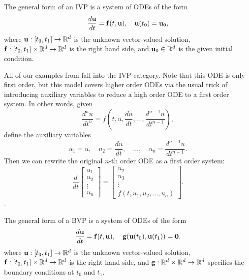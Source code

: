 \begin{definition}[IVP]
    \label{def:ivp}
    The general form of an IVP is a system of ODEs of the form 
    \begin{equation*}
        \frac{d\mathbf{u}}{dt} = \mathbf{f}(t, \mathbf{u}), 
        \quad \mathbf{u}(t_0) = \mathbf{u}_0,
    \end{equation*}
    where $\mathbf{u}: [t_0, t_1] \to \mathbb{R}^d$ is the unknown vector-valued 
    solution, $\mathbf{f}: [t_0, t_1] \times \mathbb{R}^d \to \mathbb{R}^d$ is the right hand side, 
    and $\mathbf{u}_0 \in \mathbb{R}^d$ is the given initial condition.
\end{definition}
All of our examples from  fall into the IVP category. 
Note that this ODE is only first order, but this model covers 
higher order ODEs via the usual trick of introducing 
auxiliary variables to reduce a high order ODE to a 
first order system. In other words, given 
\begin{equation*}
    \frac{d^n u}{dt^n} = 
    f\left(t, u, \frac{du}{dt}, \ldots, \frac{d^{n-1} u}{dt^{n-1}}\right), 
\end{equation*}
define the auxiliary variables
\begin{equation*}
    u_1 = u, \quad u_2 = \frac{du}{dt}, \quad \ldots, \quad u_n = \frac{d^{n-1} u}{dt^{n-1}}.
\end{equation*}
Then we can rewrite the original $n$-th order ODE as a first order system:
\begin{equation*}
    \frac{d}{dt} \begin{bmatrix} u_1 \\ u_2 \\ \vdots \\ u_n \end{bmatrix}
    = \begin{bmatrix} u_2 \\ u_3 \\ \vdots \\ f(t, u_1, u_2, \ldots, u_n) \end{bmatrix}.
\end{equation*}.

\begin{definition}[BVP]
\label{def:bvp}
    The general form of a BVP is a system of ODEs of the form 
    \begin{equation*}
        \frac{d\mathbf{u}}{dt} = \mathbf{f}(t, \mathbf{u}), 
        \quad \mathbf{g}(\mathbf{u}(t_0), \mathbf{u}(t_1)) = \mathbf{0},
    \end{equation*}
    where $\mathbf{u}: [t_0, t_1] \to \mathbb{R}^d$ is the unknown vector-valued 
    solution, $\mathbf{f}: [t_0, t_1] \times \mathbb{R}^d \to \mathbb{R}^d$ is the right hand side, 
    and $\mathbf{g}: \mathbb{R}^d \times \mathbb{R}^d \to \mathbb{R}^d$ specifies the boundary conditions at $t_0$ and $t_1$.
\end{definition}

